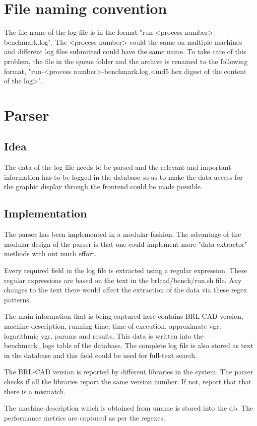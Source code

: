 \documentclass[a4paper,12pt, titlepage]{article}
\begin{document}
\section{File naming convention}
The file name of the log file is in the format "run-<process number>-benchmark.log". The <process number> could the same on multiple machines and different log files submitted could have the same name. To take care of this problem, the file in the queue folder and the archive is renamed to the following format, "run-<process number>-benchmark.log.<md5 hex digest of the content of the log>".

\section{Parser}
\subsection{Idea}
The data of the log file needs to be parsed and the relevant and important information has to be logged in the database so as to make the data access for the graphic display through the frontend could be made possible.  

\subsection{Implementation} 
The parser has been implemented in a modular fashion. The advantage of the modular design of the parser is that one could implement more "data extractor" methods with out much effort. 

Every required field in the log file is extracted using a regular expression. These regular expressions are based on the text in the brlcad/bench/run.sh file. Any changes to the text there would affect the extraction of the data via these regex patterns. 

The main information that is being captured here contains BRL-CAD version, machine description, running time, time of execution, approximate vgr, logarithmic vgr, params and results. This data is written into the benchmark\_logs table of the database. The complete log file is also stored as text in the database and this field could be used for full-text search.

The BRL-CAD version is reported by different libraries in the system. The parser checks if all the libraries report the same version number. If not, report that that there is a mismatch.

The machine description which is obtained from uname is stored into the db. The performance metrics are captured as per the regexes. 
\end{document}
